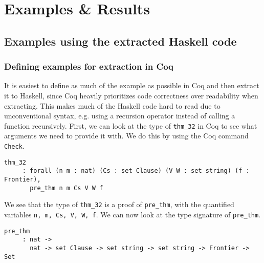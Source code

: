 \chapter{Examples \& Results}
\label{chap:examples_results}

\section{Examples using the extracted Haskell code}
\label{sec:examples}

\subsection{Defining examples for extraction in Coq}
\label{sec:defining_examples}

It is easiest to define as much of the example as possible in Coq and then extract it to Haskell,
since Coq heavily prioritizes code correctness over readability when extracting.
This makes much of the Haskell code hard to read due to unconventional syntax,
e.g. using a recursion operator instead of calling a function recursively.
First, we can look at the type of \lstinline{thm_32} in Coq to see what arguments we need to provide it with.
We do this by using the Coq command \lstinline{Check}.

\begin{minipage}{\linewidth}
\begin{lstlisting}[language=Coq, label={lst:thm_32_type_sig_coq}, caption={Type signature of \lstinline{thm_32} in Coq}]
thm_32
     : forall (n m : nat) (Cs : set Clause) (V W : set string) (f : Frontier),
       pre_thm n m Cs V W f
\end{lstlisting}
\end{minipage}

We see that the type of \lstinline{thm_32} is a proof of \lstinline{pre_thm}, with the quantified variables
\lstinline{n, m, Cs, V, W, f}.
We can now look at the type signature of \lstinline{pre_thm}.

\begin{minipage}{\linewidth}
\begin{lstlisting}[language=Coq, label={lst:pre_thm_type_sig_coq}, caption={Type signature of \lstinline{pre_thm} in Coq}]
pre_thm
     : nat ->
       nat -> set Clause -> set string -> set string -> Frontier -> Set
\end{lstlisting}
\end{minipage}

